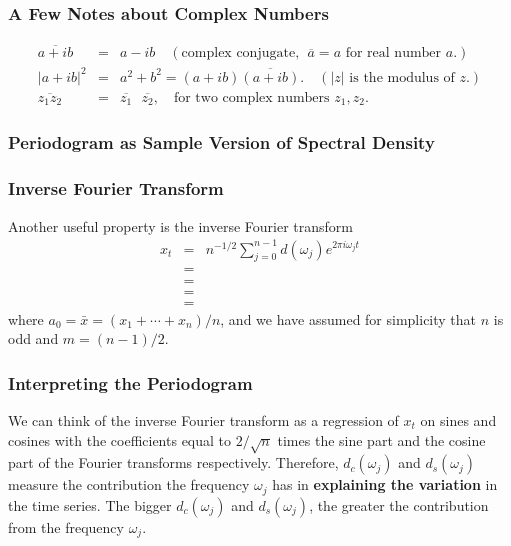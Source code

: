 \documentclass[%
xcolor=pdftex]{beamer}
\begin{document}
\begin{frame}
\frametitle{A Few Notes about Complex Numbers}

\begin{eqnarray*}
\overline{a+ib}&=&a-ib \quad (\mbox{complex conjugate},~~ \overline{a}=a\mbox{~for real number~}a.) \\
|a+ib|^2&=&a^2+b^2=(a+ib)\overline{(a+ib)}. \quad (|z| \mbox{~is the modulus of~} z.) \\
\overline{z_1 z_2} &=& \overline{z_1}\text{  }\overline{z_2}, \quad
\mbox{for two complex numbers~} z_1,z_2.
\end{eqnarray*}

\end{frame}

\begin{frame}
\frametitle{Periodogram as Sample Version of Spectral Density}



\end{frame}

\begin{frame}
\frametitle{Inverse Fourier Transform}

Another useful property is the inverse Fourier transform
\begin{eqnarray*}
x_t&=&n^{-1/2} \sum_{j=0}^{n-1} d(\omega_j) e^{2 \pi i \omega_j t} \\
&=& \\
&=& \\
&=& \\
&=&
\end{eqnarray*}
where $a_0=\bar{x}=(x_1+\cdots+x_n)/n$, and we have assumed for
simplicity that $n$ is odd and $m=(n-1)/2$.

\end{frame}

\begin{frame}
\frametitle{Interpreting the Periodogram}

We can think of the inverse Fourier transform as a
regression of $x_t$ on  sines and cosines with the coefficients
equal to $2/\sqrt{n}$ times the sine part and the cosine part
of the Fourier transforms respectively. Therefore,
$d_c(\omega_j)$ and $d_s(\omega_j)$ measure the contribution the frequency $\omega_j$ has in \textbf{explaining the variation} in
the time series. The bigger $d_c(\omega_j)$ and
$d_s(\omega_j)$, the greater the contribution from the
frequency $\omega_j$.

\end{frame}
\end{document}
